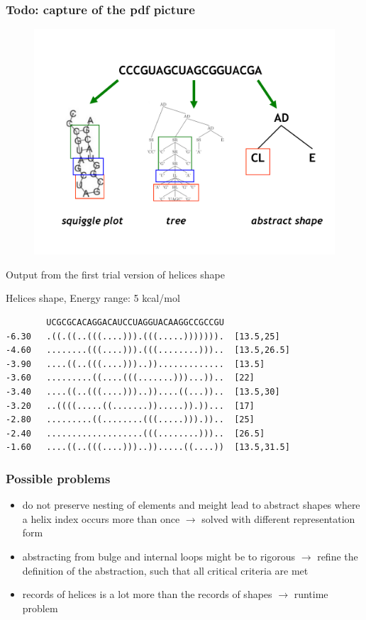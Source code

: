 \documentclass[ignorenonframetext,10pt]{beamer}
\begin{document}
\begin{frame}
\frametitle{Todo: capture of the pdf picture}
\begin{figure}
  \includegraphics[scale=0.4]{images/shrep_example.pdf} 
\end{figure}
\end{frame}


\begin{frame}[fragile]
  Output from the first trial version of helices shape
  \begin{block}{\small Helices shape, Energy range: 5 kcal/mol}
  \begin{verbatim}
        UCGCGCACAGGACAUCCUAGGUACAAGGCCGCCGU
-6.30   .((.((..(((....))).(((.....))))))).  [13.5,25]  
-4.60   ........(((....))).(((........)))..  [13.5,26.5] 
-3.90   ....((..(((....)))..)).............  [13.5]
-3.60   .........((....(((.......)))...))..  [22]
-3.40   ....((..(((....)))..))....((...))..  [13.5,30]
-3.20   ..((((.....((.......)).....)).))...  [17]
-2.80   .........((........(((.....))).))..  [25]
-2.40   ...................(((........)))..  [26.5]
-1.60   ....((..(((....)))..)).....((....))  [13.5,31.5]
  \end{verbatim} 
  \end{block}
\end{frame}


\begin{frame}
\frametitle{Possible problems}
    \begin{itemize} 
    \item do not preserve nesting of elements and meight lead to abstract shapes
    where a helix index occurs more than once $\rightarrow$ solved with
    different representation form
    \item abstracting from bulge and internal loops might be to rigorous
    $\rightarrow$ refine the definition of the abstraction, such that all critical criteria
    are met
    \item records of helices is a lot more than the records of shapes
    $\rightarrow$ runtime problem  %
    \end{itemize}
\end{frame}
\end{document}
